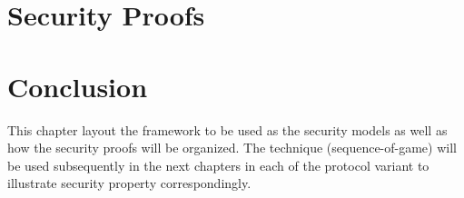 \section{Security Proofs}


\section{Conclusion}
This chapter layout the framework to be used as the security models as well as
how the security proofs will be organized. The technique (sequence-of-game) will
be used subsequently in the next chapters in each of the protocol variant to
illustrate security property correspondingly. 
